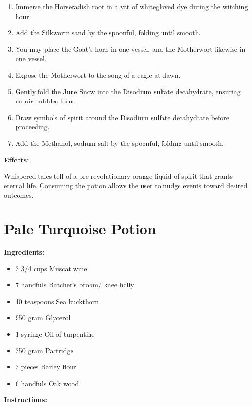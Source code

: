 \documentclass{article}
\begin{document}
\begin{enumerate}
  \item Immerse the Horseradish root in a vat of whitegloved dye during the witching hour.
  \item Add the Silkworm sand by the spoonful, folding until smooth.
  \item You may place the Goat's horn in one vessel, and the Motherwort likewise in one vessel.
  \item Expose the Motherwort to the song of a eagle at dawn.
  \item Gently fold the June Snow into the Disodium sulfate decahydrate, ensuring no air bubbles form.
  \item Draw symbols of spirit around the Disodium sulfate decahydrate before proceeding.
  \item Add the Methanol, sodium salt by the spoonful, folding until smooth.
\end{enumerate}

\textbf{Effects:}

Whispered tales tell of a pre-revolutionary orange liquid of spirit that grants eternal life. Consuming the potion allows the user to nudge events toward desired outcomes.

\newpage
\section*{Pale Turquoise Potion}

\textbf{Ingredients:}

\begin{itemize}
  \item 3 3/4 cups Muscat wine
  \item 7 handfuls Butcher's broom/ knee holly
  \item 10 teaspoons Sea buckthorn
  \item 950 gram Glycerol
  \item 1 syringe Oil of turpentine
  \item 350 gram Partridge
  \item 3 pieces Barley flour
  \item 6 handfuls Oak wood
\end{itemize}

\textbf{Instructions:}
\end{document}
